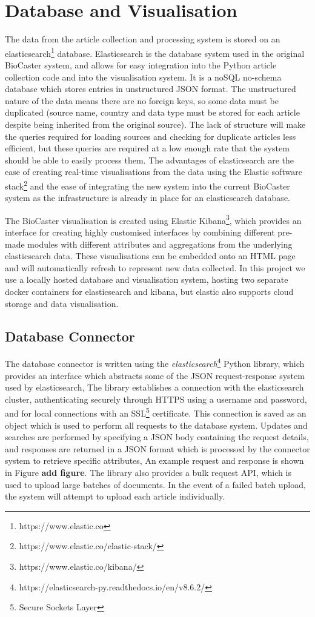 \documentclass{l4proj}
\begin{document}
\section{Database and Visualisation}
The data from the article collection and processing system is stored on an elasticsearch\footnote{https://www.elastic.co} database. Elasticsearch is the database system used in the original BioCaster system, and allows for easy integration into the Python article collection code and into the visualisation system. It is a noSQL no-schema database which stores entries in unstructured JSON format. The unstructured nature of the data means there are no foreign keys, so some data must be duplicated (source name, country and data type must be stored for each article despite being inherited from the original source). The lack of structure will make the queries required for loading sources and checking for duplicate articles less efficient, but these queries are required at a low enough rate that the system should be able to easily process them. The advantages of elasticsearch are the ease of creating real-time visualisations from the data using the Elastic software stack\footnote{https://www.elastic.co/elastic-stack/} and the ease of integrating the new system into the current BioCaster system as the infrastructure is already in place for an elasticsearch database.\par
The BioCaster visualisation is created using Elastic Kibana\footnote{https://www.elastic.co/kibana/}, which provides an interface for creating highly customised interfaces by combining different pre-made modules with different attributes and aggregations from the underlying elasticsearch data. These visualisations can be embedded onto an HTML page and will automatically refresh to represent new data collected. In this project we use a locally hosted database and visualisation system, hosting two separate docker containers for elasticsearch and kibana, but elastic also supports cloud storage and data visualisation. 

\subsection{Database Connector}
The database connector is written using the \emph{elasticsearch}\footnote{https://elasticsearch-py.readthedocs.io/en/v8.6.2/} Python library, which provides an interface which abstracts some of the JSON request-response system used by elasticsearch, The library establishes a connection with the elasticsearch cluster, authenticating securely through HTTPS using a username and password, and for local connections with an SSL\footnote{Secure Sockets Layer} certificate. This connection is saved as an object which is used to perform all requests to the database system. Updates and searches are performed by specifying a JSON body containing the request details, and responses are returned in a JSON format which is processed by the connector system to retrieve specific attributes, An example request and response is shown in Figure \textbf{add figure}. The library also provides a bulk request API, which is used to upload large batches of documents. In the event of a failed batch upload, the system will attempt to upload each article individually.
\end{document}
